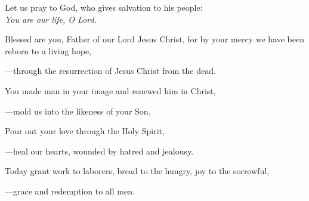 \intercessions\indent

\begin{hangpar}

Let us pray to God, who gives salvation to his people:\\
\emph{You are our life, O Lord.}

\medskip Blessed are you, Father of our Lord Jesus Christ, for by your mercy we have been reborn to a living hope,

{\color{red}---\thinspace}through the resurrection of Jesus Christ from the dead.

\medskip You made man in your image and renewed him in Christ,

{\color{red}---\thinspace}mold us into the likeness of your Son.

\medskip Pour out your love through the Holy Spirit,

{\color{red}---\thinspace}heal our hearts, wounded by hatred and jealousy.

\medskip Today grant work to laborers, bread to the hungry, joy to the sorrowful,

{\color{red}---\thinspace}grace and redemption to all men.

\end{hangpar}


